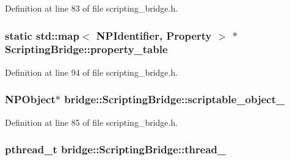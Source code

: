 Definition at line 83 of file scripting\_\-bridge.h.

\hypertarget{classbridge_1_1_scripting_bridge_a84c8336a6ba799945dfe31358d389a62}{
\subsubsection[{property\_\-table}]{\setlength{\rightskip}{0pt plus 5cm}static std::map$<$ NPIdentifier, {\bf Property} $>$ $\ast$ {\bf ScriptingBridge::property\_\-table}}}
\label{classbridge_1_1_scripting_bridge_a84c8336a6ba799945dfe31358d389a62}


Definition at line 94 of file scripting\_\-bridge.h.

\hypertarget{classbridge_1_1_scripting_bridge_a2f4a3c451a7056118de408d2d28d3936}{
\subsubsection[{scriptable\_\-object\_\-}]{\setlength{\rightskip}{0pt plus 5cm}NPObject$\ast$ {\bf bridge::ScriptingBridge::scriptable\_\-object\_\-}}}
\label{classbridge_1_1_scripting_bridge_a2f4a3c451a7056118de408d2d28d3936}


Definition at line 85 of file scripting\_\-bridge.h.

\hypertarget{classbridge_1_1_scripting_bridge_a58b77b4f3b290be810a88c67ba61db9d}{
\subsubsection[{thread\_\-}]{\setlength{\rightskip}{0pt plus 5cm}pthread\_\-t {\bf bridge::ScriptingBridge::thread\_\-}}}
\label{classbridge_1_1_scripting_bridge_a58b77b4f3b290be810a88c67ba61db9d}


